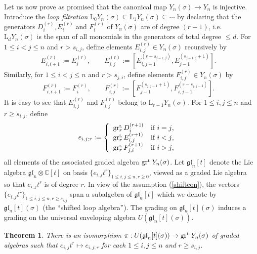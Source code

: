 \documentclass[twoside,12pt,reqno]{amsart}
\newtheorem{Theorem}[Proposition]{Theorem}
\def\C{{\mathbb C}}
\def\LL{{{\scriptscriptstyle\text{\rm{L}}}}}
\def\L{\mathrm{L}}
\def\gr{\operatorname{gr}}
\begin{document}
Let us now prove as promised that the canonical map
$Y_n(\sigma) \rightarrow Y_n$ is injective.
Introduce the {\em loop filtration}
$\L_0 Y_n(\sigma) \subseteq \L_1 Y_n(\sigma) \subseteq \cdots$
by declaring that the generators
$D_i^{(r)}, E_i^{(r)}$ and $F_i^{(r)}$ of $Y_n(\sigma)$
are of degree $(r-1)$,
i.e. $\L_d Y_n(\sigma)$ is the span of all monomials in
the generators of total degree $\leq d$.
For $1 \leq i < j \leq n$ and $r > s_{i,j}$, define
elements $E_{i,j}^{(r)} \in Y_n(\sigma)$ recursively by
\begin{equation}
E_{i,i+1}^{(r)} := E_i^{(r)},
\qquad
E_{i,j}^{(r)} := [E_{i,j-1}^{(r - s_{j-1,j})}, E_{j-1}^{(s_{j-1,j}+1)}].
\end{equation}
Similarly, for $1 \leq i < j \leq n$ and $r > s_{j,i}$, define
elements $F_{i,j}^{(r)} \in Y_n(\sigma)$ by
\begin{equation}
F_{i,i+1}^{(r)} := F_i^{(r)},
\qquad
F_{i,j}^{(r)} := [F_{j-1}^{(s_{j,j-1}+1)},F_{i,j-1}^{(r - s_{j,j-1})}].
\end{equation}
It is easy to see that $E_{i,j}^{(r)}$ and $F_{i,j}^{(r)}$
belong to $\L_{r-1} Y_n(\sigma)$.
For $1 \leq i,j \leq n$ and $r \geq s_{i,j}$, define
\begin{equation}\label{newelts}
e_{i,j;r} := \left\{
\begin{array}{ll}
\gr^\LL_{r} D_{i}^{(r+1)} &\hbox{if $i = j$,}\\
\gr^\LL_{r} E_{i,j}^{(r+1)} &\hbox{if $i < j$,}\\
\gr^\LL_{r} F_{j,i}^{(r+1)} &\hbox{if $i > j$,}
\end{array}
\right.
\end{equation}
all elements of the associated graded algebra $\gr^\LL Y_n(\sigma)$.
Let $\mathfrak{gl}_n[t]$ denote the Lie algebra
$\mathfrak{gl}_n \otimes \C[t]$ on basis 
$\{e_{i,j}t^r\}_{1 \leq i,j \leq n, r \geq 0}$, viewed
as a graded Lie algebra so that $e_{i,j}t^r$ is of degree $r$.
In view of the assumption (\ref{shiftcon}), 
the vectors $\{e_{i,j}t^r\}_{1 \leq i,j \leq n, r \geq s_{i,j}}$
span a subalgebra of $\mathfrak{gl}_n[t]$
which we denote by $\mathfrak{gl}_n[t](\sigma)$ (the ``shifted loop algebra'').
The grading on $\mathfrak{gl}_n[t](\sigma)$
induces a grading on the universal enveloping algebra
$U(\mathfrak{gl}_n[t](\sigma))$.

\begin{Theorem}\label{pbw0}
There is an isomorphism
$\pi:U(\mathfrak{gl}_n[t](\sigma)) \rightarrow \gr^\LL
Y_n(\sigma)$ of graded algebras such that
$e_{i,j}t^r \mapsto e_{i,j;r}$ for each $1 \leq i,j \leq n$
and $r \geq s_{i,j}$.
\end{Theorem}
\end{document}

